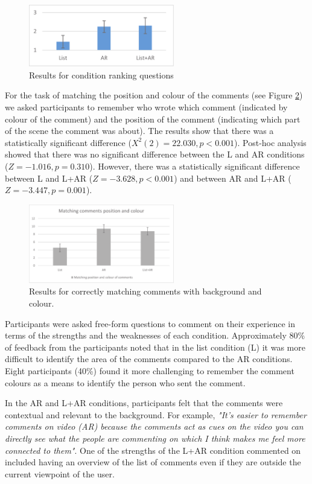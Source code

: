 \begin{figure}[ht]
  \centering
  \includegraphics[width=2.5in]{images/mgia16/ranking.eps}
  \caption{Results for condition ranking questions}
	\label{fig:mgia16:ranking}
\end{figure}

For the task of matching the position and colour of the comments (see Figure \ref{fig:mgia16:questions_matching}) we asked participants to remember who wrote which comment (indicated by colour of the comment) and the position of the comment (indicating which part of the scene the comment was about). The results show that there was a statistically significant difference ($X^2(2)=22.030, p<0.001$). Post-hoc analysis showed that there was no significant difference between the L and AR conditions ($Z=-1.016, p=0.310$). However, there was a statistically significant difference between L and L+AR ($Z=-3.628, p<0.001$) and between AR and L+AR ($Z=-3.447, p=0.001$).

\begin{figure}[ht]
  \centering
  \includegraphics[width=2.5in]{images/mgia16/matching.eps}
  \caption{Results for correctly matching comments with background and colour.}
	\label{fig:mgia16:questions_matching}
\end{figure}

Participants were asked free-form questions to comment on their experience in terms of the strengths and the weaknesses of each condition. Approximately 80\% of feedback from the participants noted that in the list condition (L) it was more difficult to identify the area of the comments compared to the AR conditions. Eight participants (40\%) found it more challenging to remember the comment colours as a means to identify the person who sent the comment. 

In the AR and L+AR conditions, participants felt that the comments were contextual and relevant to the background. For example, \textit{"It's easier to remember comments on video (AR) because the comments act as cues on the video you can directly see what the people are commenting on which I think makes me feel more connected to them"}. One of the strengths of the L+AR condition commented on included having an overview of the list of comments even if they are outside the current viewpoint of the user. 

